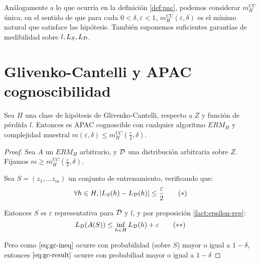 Análogamente a lo que ocurría en la definición \ref{def:pac}, podemos considerar $m_H^{CU}$ única, en el sentido de
que para cada $0 < \delta, \varepsilon < 1$, $m_{H}^{CU}(\varepsilon, \delta)$ es el mínimo natural que satisface las 
hipótesis. También suponemos suficientes garantías de medibilidad sobre $l, L_S, L_{\mathcal{D}}$.

\section{Glivenko-Cantelli y APAC cognoscibilidad}

\begin{theorem}
Sea $H$ una clase de hipótesis de Glivenko-Cantelli, respecto a $Z$ y función de pérdida $l$. 
Entonces es APAC cognoscible con cualquier algoritmo $ERM_H$ y complejidad muestral
$m(\varepsilon, \delta) \le m_{H}^{UC} \left(\frac{\varepsilon}{2}, \delta \right)$. 
\label{th:gc-apac}
\end{theorem}

  \begin{proof}
   Sea $A$ un $ERM_H$ arbitrario, y $\mathcal{D}$ una distribución arbitraria sobre $Z$.
   Fijamos $m \ge m_{H}^{UC} \left(\frac{\varepsilon}{2}, \delta \right)$.

   Sea $S = (z_1, \ldots z_m)$ un conjunto de entrenamiento, verificando que: 
   \begin{equation}
     \forall h\in H, |L_{S}(h)-L_{\mathcal{D}}(h)| \le \frac{\varepsilon}{2}
     \label{eq:gc-ineq}\tag{$\ast$}
   \end{equation}

   Entonces $S$ es $\varepsilon$ representativa para $\mathcal{D}$ y $l$, y por proposición \ref{fact:epsilon-rep}:
   \begin{equation}
    L_{\mathcal{D}}(A(S)) \le \inf_{h\in H} L_{\mathcal{D}}(h) + \varepsilon
    \label{eq:gc-result}\tag{$\ast$$\ast$}
   \end{equation}

   Pero como $\eqref{eq:gc-ineq}$ ocurre con probabilidad (sobre $S$) mayor o igual a $1-\delta$, entonces 
   $\eqref{eq:gc-result}$ ocurre con probabiliad mayor o igual a $1-\delta$
  \end{proof}
  
